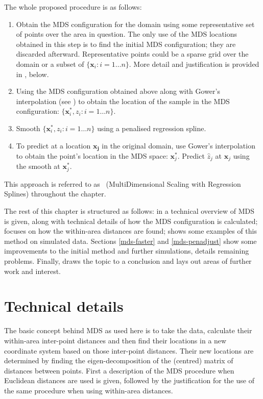The whole proposed procedure is as follows:

\begin{enumerate}
\item Obtain the MDS configuration for the domain using some representative set of points over the area in question. The only use of the MDS locations obtained in this step is to find the initial MDS configuration; they are discarded afterward. Representative points could be a sparse grid over the domain or a subset of $\{\bm{x}_i : i=1\dots n\}$. More detail and justification is provided in , below.

\item Using the MDS configuration obtained above along with Gower's interpolation (see ) to obtain the location of the sample in the MDS configuration: $\{\bm{x}_i^*, z_i : i=1\dots n\}$.

\item Smooth $\{\bm{x}_i^*, z_i : i=1\dots n\}$ using a penalised regression spline.

\item To predict at a location $\bm{x_j}$ in the original domain, use Gower's interpolation to obtain the point's location in the MDS space: $\bm{x}_j^*$. Predict $\hat{z}_j$ at $\bm{x}_j$ using the smooth at $\bm{x}_j^*$.
\end{enumerate}

This approach is referred to as \mdsap\ (MultiDimensional Scaling with Regression Splines) throughout the chapter.

The rest of this chapter is structured as follows: in  a technical overview of MDS is given, along with technical details of how the MDS configuration is calculated;  focuses on how the within-area distances are found;  shows some examples of this method on simulated data. Sections \ref{mds-faster} and \ref{mds-penadjust} show some improvements to the initial method and further simulations,  details remaining problems. Finally,  draws the topic to a conclusion and lays out areas of further work and interest.


\section{Technical details}
\label{MDStechdet}

The basic concept behind MDS as used here is to take the data, calculate their within-area inter-point distances and then find their locations in a new coordinate system based on those inter-point distances. Their new locations are determined by finding the eigen-decomposition of the (centred) matrix of distances between points. First a description of the MDS procedure when Euclidean distances are used is given, followed by the justification for the use of the same procedure when using within-area distances. 

